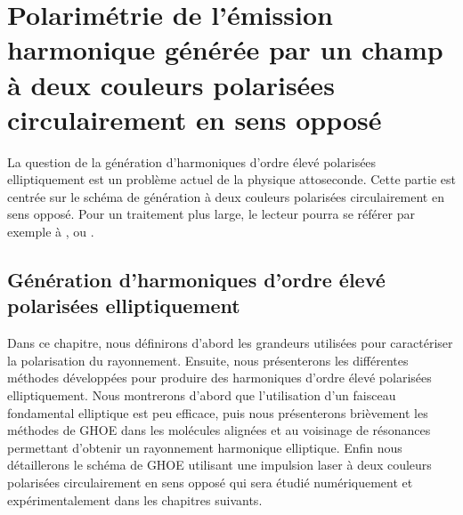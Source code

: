 \part{Polarimétrie de l'émission harmonique générée par un champ à deux couleurs polarisées circulairement en sens opposé}
\label{part:Polarimétrie}



La question de la génération d'harmoniques d'ordre élevé polarisées elliptiquement est un problème actuel de la physique attoseconde. Cette partie est centrée sur le schéma de génération à deux couleurs polarisées circulairement en sens opposé. Pour un traitement plus large, le lecteur pourra se référer par exemple à ,  ou .

\chapter{Génération d'harmoniques d'ordre élevé polarisées elliptiquement}
\label{chap:GHOE_elliptiques}
Dans ce chapitre, nous définirons d'abord les grandeurs utilisées pour caractériser la polarisation du rayonnement. Ensuite, nous présenterons les différentes méthodes développées pour produire des harmoniques d'ordre élevé polarisées elliptiquement. Nous montrerons d'abord que l'utilisation d'un faisceau fondamental elliptique est peu efficace, puis nous présenterons brièvement les méthodes de GHOE dans les molécules alignées et au voisinage de résonances permettant d'obtenir un rayonnement harmonique elliptique. Enfin nous détaillerons le schéma de GHOE utilisant une impulsion laser à deux couleurs polarisées circulairement en sens opposé qui sera étudié numériquement et expérimentalement dans les chapitres suivants. 

